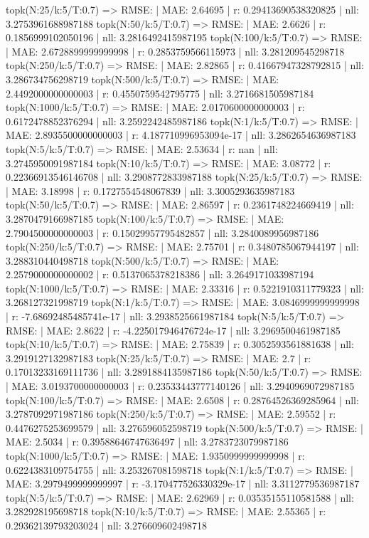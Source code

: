 topk(N:25/k:5/T:0.7) => RMSE: | MAE: 2.64695 | r: 0.29413690538320825 | nll: 3.2753961688987188
topk(N:50/k:5/T:0.7) => RMSE: | MAE: 2.6626 | r: 0.1856999102050196 | nll: 3.2816492415987195
topk(N:100/k:5/T:0.7) => RMSE: | MAE: 2.6728899999999998 | r: 0.2853759566115973 | nll: 3.281209545298718
topk(N:250/k:5/T:0.7) => RMSE: | MAE: 2.82865 | r: 0.41667947328792815 | nll: 3.286734756298719
topk(N:500/k:5/T:0.7) => RMSE: | MAE: 2.4492000000000003 | r: 0.4550759542795775 | nll: 3.2716681505987184
topk(N:1000/k:5/T:0.7) => RMSE: | MAE: 2.0170600000000003 | r: 0.6172478852376294 | nll: 3.2592242485987186
topk(N:1/k:5/T:0.7) => RMSE: | MAE: 2.8935500000000003 | r: 4.187710996953094e-17 | nll: 3.2862654636987183
topk(N:5/k:5/T:0.7) => RMSE: | MAE: 2.53634 | r: nan | nll: 3.2745950091987184
topk(N:10/k:5/T:0.7) => RMSE: | MAE: 3.08772 | r: 0.22366913546146708 | nll: 3.2908772833987188
topk(N:25/k:5/T:0.7) => RMSE: | MAE: 3.18998 | r: 0.1727554548067839 | nll: 3.3005293635987183
topk(N:50/k:5/T:0.7) => RMSE: | MAE: 2.86597 | r: 0.2361748224669419 | nll: 3.2870479166987185
topk(N:100/k:5/T:0.7) => RMSE: | MAE: 2.7904500000000003 | r: 0.15029957795482857 | nll: 3.2840089956987186
topk(N:250/k:5/T:0.7) => RMSE: | MAE: 2.75701 | r: 0.3480785067944197 | nll: 3.288310440498718
topk(N:500/k:5/T:0.7) => RMSE: | MAE: 2.2579000000000002 | r: 0.5137065378218386 | nll: 3.2649171033987194
topk(N:1000/k:5/T:0.7) => RMSE: | MAE: 2.33316 | r: 0.5221910311779323 | nll: 3.268127321998719
topk(N:1/k:5/T:0.7) => RMSE: | MAE: 3.0846999999999998 | r: -7.68692485485741e-17 | nll: 3.2938525661987184
topk(N:5/k:5/T:0.7) => RMSE: | MAE: 2.8622 | r: -4.225017946476724e-17 | nll: 3.2969500461987185
topk(N:10/k:5/T:0.7) => RMSE: | MAE: 2.75839 | r: 0.3052593561881638 | nll: 3.2919127132987183
topk(N:25/k:5/T:0.7) => RMSE: | MAE: 2.7 | r: 0.17013233169111736 | nll: 3.2891884135987186
topk(N:50/k:5/T:0.7) => RMSE: | MAE: 3.0193700000000003 | r: 0.23533443777140126 | nll: 3.2940969072987185
topk(N:100/k:5/T:0.7) => RMSE: | MAE: 2.6508 | r: 0.28764526369285964 | nll: 3.2787092971987186
topk(N:250/k:5/T:0.7) => RMSE: | MAE: 2.59552 | r: 0.4476275253699579 | nll: 3.276596052598719
topk(N:500/k:5/T:0.7) => RMSE: | MAE: 2.5034 | r: 0.39588646747636497 | nll: 3.2783723079987186
topk(N:1000/k:5/T:0.7) => RMSE: | MAE: 1.9350999999999998 | r: 0.6224383109754755 | nll: 3.253267081598718
topk(N:1/k:5/T:0.7) => RMSE: | MAE: 3.2979499999999997 | r: -3.170477526330329e-17 | nll: 3.3112779536987187
topk(N:5/k:5/T:0.7) => RMSE: | MAE: 2.62969 | r: 0.03535155110581588 | nll: 3.282928195698718
topk(N:10/k:5/T:0.7) => RMSE: | MAE: 2.55365 | r: 0.29362139793203024 | nll: 3.276609602498718

